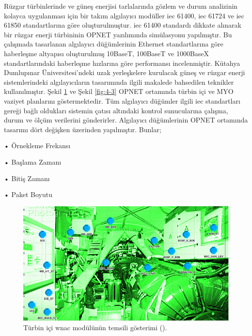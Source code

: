 Rüzgar türbinlerinde ve güneş enerjisi tarlalarında gözlem ve durum analizinin kolayca uygulanması için bir takım algılayıcı modüller \gls{iec} 61400, \gls{iec} 61724 ve \gls{iec} 61850 standartlarına göre oluşturulmuştur\cite{ahmed2011simulation}. \gls{iec} 61400 standardı dikkate alınarak bir rüzgar enerji türbininin OPNET yazılımında simülasyonu yapılmıştır. Bu çalışmada tasarlanan algılayıcı düğümlerinin Ethernet standartlarına göre haberleşme altyapısı oluşturulmuş 10BaseT, 100BaseT ve 1000BaseX standartlarındaki haberleşme hızlarına göre performansı incelenmiştir.
Kütahya Dumlupınar Üniversitesi'ndeki uzak yerleşkelere kurulacak güneş ve rüzgar enerji sistemlerindeki algılayıcıların tasarımında ilgili makalede bahsedilen teknikler kullanılmıştır. Şekil \ref{fig:4-2} ve Şekil \ref{fig:4-3} OPNET ortamında türbin içi ve MYO vaziyet planlarını göstermektedir. Tüm algılayıcı düğümler ilgili \gls{iec} standartları gereği bağlı oldukları sistemin çatısı altındaki kontrol sunucularına çalışma, durum ve ölçüm verilerini gönderirler. Algılayıcı düğümlerinin OPNET ortamında tasarımı dört değişken üzerinden yapılmıştır\cite{ahmed2011simulation}. Bunlar;

•	Örnekleme Frekansı

•	Başlama Zamanı

•	Bitiş Zamanı

•	Paket Boyutu

\begin{figure}[htbp]
\centerline{\includegraphics[width=\columnwidth]{Resim/Sekil4-2.png}}
\caption{Türbin içi \gls{wnac} modülünün temsili gösterimi (\protect{}).}
\label{fig:4-2}
\end{figure}


